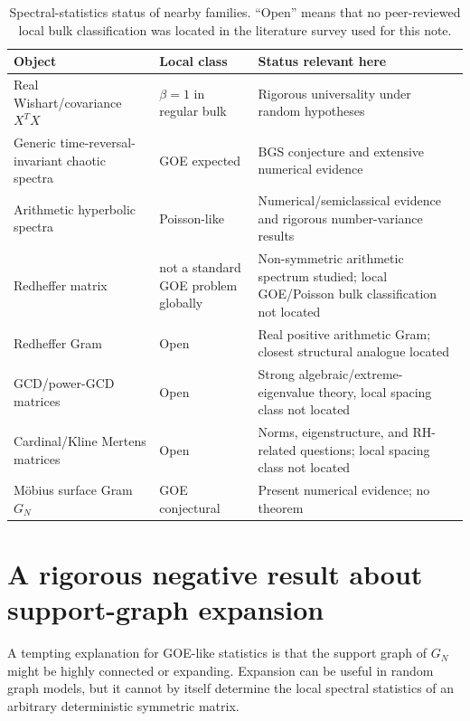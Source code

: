 \documentclass[11pt]{amsart}
\numberwithin{equation}{section}
\theoremstyle{plain}
\theoremstyle{definition}
\theoremstyle{remark}
\begin{document}
\begin{table}[htbp]
\centering
\caption{Spectral-statistics status of nearby families.  ``Open'' means that no peer-reviewed local bulk classification was located in the literature survey used for this note.}
\label{tab:literature_status}
\begin{tabular}{p{}p{}p{}}
\toprule
Object & Local class & Status relevant here\\
\midrule
Real Wishart/covariance $X^TX$ & $\beta=1$ in regular bulk & Rigorous universality under random hypotheses \cite{TaoVu2012,PillaiYin2014}\\
Generic time-reversal-invariant chaotic spectra & GOE expected & BGS conjecture and extensive numerical evidence \cite{BGS1984}\\
Arithmetic hyperbolic spectra & Poisson-like & Numerical/semiclassical evidence and rigorous number-variance results \cite{BogomolnyEtAl1992,LuoSarnak1994}\\
Redheffer matrix & not a standard GOE problem globally & Non-symmetric arithmetic spectrum studied; local GOE/Poisson bulk classification not located \cite{BarrettJarvis1992}\\
Redheffer Gram & Open & Real positive arithmetic Gram; closest structural analogue located \cite{ClementSteinerberger2025}\\
GCD/power-GCD matrices & Open & Strong algebraic/extreme-eigenvalue theory, local spacing class not located \cite{HongLoewy2004}\\
Cardinal/Kline Mertens matrices & Open & Norms, eigenstructure, and RH-related questions; local spacing class not located \cite{Cardinal2010,Kline2019,Kline2020}\\
M\"obius surface Gram $G_N$ & GOE conjectural & Present numerical evidence; no theorem\\
\bottomrule
\end{tabular}
\end{table}

\section{A rigorous negative result about support-graph expansion}
\label{sec:negative_expansion_result}

A tempting explanation for GOE-like statistics is that the support graph of $G_N$ might be highly connected or expanding.  Expansion can be useful in random graph models, but it cannot by itself determine the local spectral statistics of an arbitrary deterministic symmetric matrix.
\end{document}
